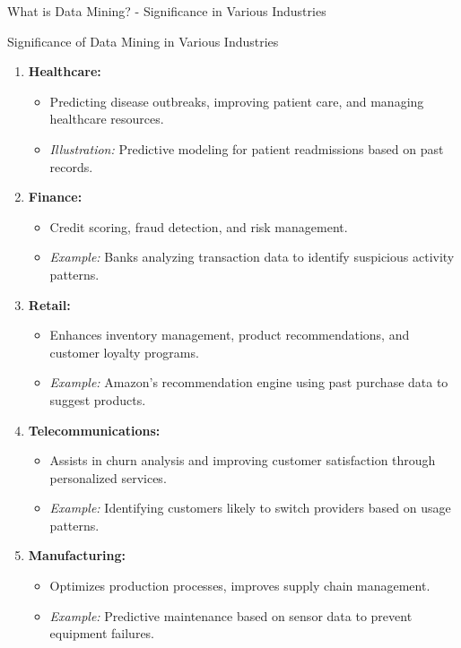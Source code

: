 \documentclass[aspectratio=169]{beamer}
\begin{document}
\begin{frame}[fragile]{What is Data Mining? - Significance in Various Industries}
    \begin{block}{Significance of Data Mining in Various Industries}
        \begin{enumerate}
            \item \textbf{Healthcare:} 
                \begin{itemize}
                    \item Predicting disease outbreaks, improving patient care, and managing healthcare resources.
                    \item \textit{Illustration:} Predictive modeling for patient readmissions based on past records.
                \end{itemize}

            \item \textbf{Finance:}
                \begin{itemize}
                    \item Credit scoring, fraud detection, and risk management.
                    \item \textit{Example:} Banks analyzing transaction data to identify suspicious activity patterns.
                \end{itemize}

            \item \textbf{Retail:}
                \begin{itemize}
                    \item Enhances inventory management, product recommendations, and customer loyalty programs.
                    \item \textit{Example:} Amazon's recommendation engine using past purchase data to suggest products.
                \end{itemize}

            \item \textbf{Telecommunications:} 
                \begin{itemize}
                    \item Assists in churn analysis and improving customer satisfaction through personalized services.
                    \item \textit{Example:} Identifying customers likely to switch providers based on usage patterns.
                \end{itemize}

            \item \textbf{Manufacturing:}
                \begin{itemize}
                    \item Optimizes production processes, improves supply chain management.
                    \item \textit{Example:} Predictive maintenance based on sensor data to prevent equipment failures.
                \end{itemize}
        \end{enumerate}
    \end{block}
\end{frame}
\end{document}
